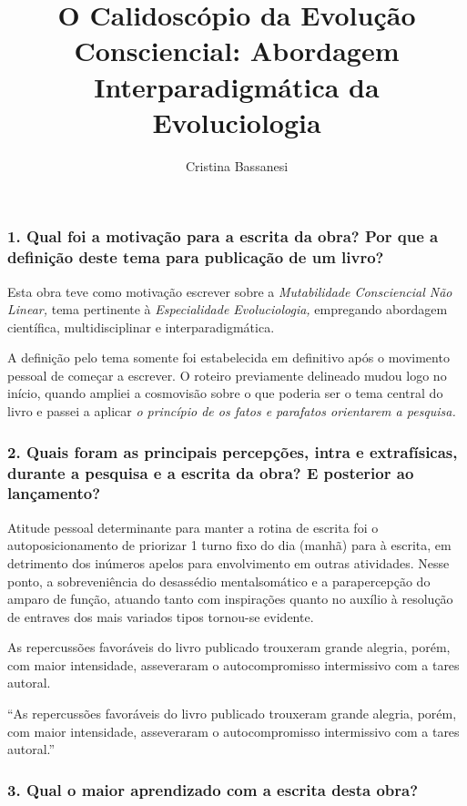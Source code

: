 \documentclass{gescons}
\author{Cristina Bassanesi}
\title{O Calidoscópio da Evolução Consciencial: Abordagem Interparadigmática da Evoluciologia}
\begin{document}
    \makeentrevistatitle

    \begin{multicols}{2}

\subsubsection{1. Qual foi a motivação para a escrita da obra? Por que a definição deste tema para publicação de um livro?}

Esta obra teve como motivação escrever sobre a \textit{Mutabilidade Consciencial Não Linear,} tema pertinente à \textit{Especialidade Evoluciologia,} empregando abordagem científica, multidisciplinar e interparadigmática.

A definição pelo tema somente foi estabelecida em definitivo após o movimento pessoal de começar a escrever. O roteiro previamente delineado mudou logo no início, quando ampliei a cosmovisão sobre o que poderia ser o tema central do livro e passei a aplicar \textit{o princípio de os fatos e parafatos orientarem a pesquisa.}

\subsubsection{2. Quais foram as principais percepções, intra e extrafísicas, durante a pesquisa e a escrita da obra? E posterior ao lançamento?}

Atitude pessoal determinante para manter a rotina de escrita foi o autoposicionamento de priorizar 1 turno fixo do dia (manhã) para à escrita, em detrimento dos inúmeros apelos para envolvimento em outras atividades. Nesse ponto, a sobreveniência do desassédio mentalsomático e a parapercepção do amparo de função, atuando tanto com inspirações quanto no auxílio à resolução de entraves dos mais variados tipos tornou-se evidente.

As repercussões favoráveis do livro publicado trouxeram grande alegria, porém, com maior intensidade, asseveraram o autocompromisso intermissivo com a tares autoral. 

\begin{pullquote}
``As repercussões favoráveis do livro publicado trouxeram grande alegria, porém, com maior intensidade, asseveraram o autocompromisso intermissivo com a tares autoral.''
\end{pullquote}

\subsubsection{3. Qual o maior aprendizado com a escrita desta obra?}


\end{multicols}
\end{document}
